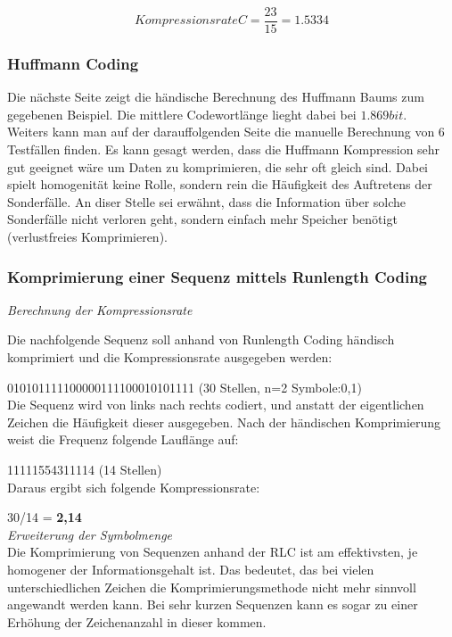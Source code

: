 \documentclass[12pt,german]{article}
\begin{document}
\begin{equation}[H]
 Kompressionsrate C = \frac{23}{15} = 1.5334	
\end{equation}


\subsubsection{Huffmann Coding}

Die nächste Seite zeigt die händische Berechnung des Huffmann Baums zum gegebenen Beispiel. Die mittlere Codewortlänge lieght dabei bei $1.869 bit $. \\

Weiters kann man auf der darauffolgenden Seite die manuelle Berechnung von 6 Testfällen finden. Es kann gesagt werden, dass die Huffmann Kompression sehr gut geeignet wäre um Daten zu komprimieren, die sehr oft gleich sind. Dabei spielt homogenität keine Rolle, sondern rein die Häufigkeit des Auftretens der Sonderfälle. An diser Stelle sei erwähnt, dass die Information über solche Sonderfälle nicht verloren geht, sondern einfach mehr Speicher benötigt (verlustfreies Komprimieren).


\label{fig:huffmannCalculation}


\label{fig:huffmannCalculation}


\subsubsection{Komprimierung einer Sequenz mittels Runlength Coding}
\textit{Berechnung der Kompressionsrate} 

Die nachfolgende Sequenz soll anhand von Runlength Coding händisch komprimiert und die Kompressionsrate ausgegeben werden:

010101111100000111100010101111 (30 Stellen, n=2 Symbole:0,1) \\

Die Sequenz wird von links nach rechts codiert, und anstatt der eigentlichen Zeichen die Häufigkeit dieser ausgegeben. Nach der händischen Komprimierung weist die Frequenz folgende Lauflänge auf:

11111554311114 (14 Stellen)\\


Daraus ergibt sich folgende Kompressionsrate:

30/14 = \textbf{ 2,14}\\

\textit{Erweiterung der Symbolmenge}\\
Die Komprimierung von Sequenzen anhand der RLC ist am effektivsten, je homogener der Informationsgehalt ist. Das bedeutet, das bei vielen unterschiedlichen Zeichen die Komprimierungsmethode nicht mehr sinnvoll angewandt werden kann. Bei sehr kurzen Sequenzen kann es sogar zu einer Erhöhung der Zeichenanzahl in dieser kommen.\\
\end{document}
